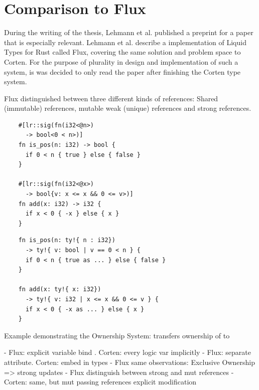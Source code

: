 \documentclass[twoside, english]{sdqthesis}
\theoremstyle{definition}
\begin{document}
\section{Comparison to Flux} \label{sec:flux}

During the writing of the thesis, Lehmann et al. \cite{lehmann_flux_2022} published a preprint for a paper that is especially relevant. Lehmann et al. describe a implementation of Liquid Types for Rust called Flux, covering the same solution and problem space to Corten. 
For the purpose of plurality in design and implementation of such a system, is was decided to only read the paper after finishing the Corten type system.

Flux distinguished between three different kinds of references: 
Shared (immutable) references, mutable weak (unique) references and strong references.

\begin{listing}[ht]
  \begin{minipage}[t]{0.48\linewidth}
    
    \begin{verbatim}
    #[lr::sig(fn(i32<@n>) 
      -> bool<0 < n>)]
    fn is_pos(n: i32) -> bool {
      if 0 < n { true } else { false }
    }

    #[lr::sig(fn(i32<@x>) 
      -> bool{v: x <= x && 0 <= v>)]
    fn add(x: i32) -> i32 {
      if x < 0 { -x } else { x }
    }
    \end{verbatim}
  \end{minipage}
  \begin{minipage}[t]{0.48\linewidth}
    \begin{verbatim}
    fn is_pos(n: ty!{ n : i32}) 
      -> ty!{ v: bool | v == 0 < n } {
      if 0 < n { true as ... } else { false }
    }

    fn add(x: ty!{ x: i32}) 
      -> ty!{ v: i32 | x <= x && 0 <= v } {
      if x < 0 { -x as ... } else { x }
    }
    \end{verbatim}
  \end{minipage}
  
  \caption{Example demonstrating the Ownership System:  transfers ownership of  to }
  \label{lst:compare-flux-fundamentals}
\end{listing}

- Flux: explicit variable bind . Corten: every logic var implicitly
- Flux: separate attribute. Corten: embed in types
- Flux same observations: Exclusive Ownership => strong updates
- Flux distinguish between strong and mut references
  - Corten: same, but mut passing references explicit modification
\end{document}
